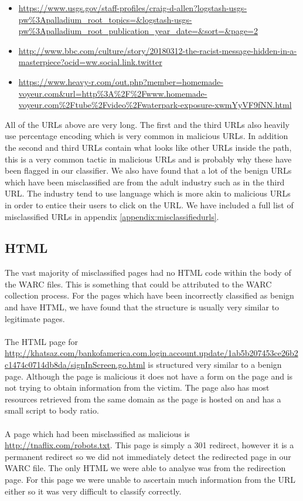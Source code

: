 \documentclass[12pt,twoside]{report}
\begin{document}
\begin{itemize}
    \item \url{https://www.usgs.gov/staff-profiles/craig-d-allen?logstash-usgs-pw\%3Apalladium_root_topics=&logstash-usgs-pw\%3Apalladium_root_publication_year_date=&sort=&page=2}
    \item \url{http://www.bbc.com/culture/story/20180312-the-racist-message-hidden-in-a-masterpiece?ocid=ww.social.link.twitter}
    \item \url{https://www.heavy-r.com/out.php?member=homemade-voyeur.com&url=http\%3A\%2F\%2Fwww.homemade-voyeur.com\%2Ftube\%2Fvideo\%2Fwaterpark-exposure-xwmYyVF9fNN.html}
\end{itemize}
All of the URLs above are very long. The first and the third URLs also heavily use percentage encoding which is very common in malicious URLs. In addition the second and third URLs contain what looks like other URLs inside the path, this is a very common tactic in malicious URLs and is probably why these have been flagged in our classifier. We also have found that a lot of the benign URLs which have been misclassified are from the adult industry such as in the third URL. The industry tend to use language which is more akin to malicious URLs in order to entice their users to click on the URL. We have included a full list of misclassified URLs in appendix \ref{appendix:misclassifiedurls}.
\subsection{HTML}
The vast majority of misclassified pages had no HTML code within the body of the WARC files. This is something that could be attributed to the WARC collection process. For the pages which have been incorrectly classified as benign and have HTML, we have found that the structure is usually very similar to legitimate pages.
\\\\
The HTML page for \url{http://khatsaz.com/bankofamerica.com.login.account.update/1ab5b207453ce26b2c1474c0714db8da/signInScreen.go.html} is structured very similar to a benign page. Although the page is malicious it does not have a form on the page and is not trying to obtain information from the victim. The page also has most resources retrieved from the same domain as the page is hosted on and has a small script to body ratio.
\\\\
A page which had been misclassified as malicious is \url{http://tnaflix.com/robots.txt}. This page is simply a 301 redirect, however it is a permanent redirect so we did not immediately detect the redirected page in our WARC file. The only HTML we were able to analyse was from the redirection page. For this page we were unable to ascertain much information from the URL either so it was very difficult to classify correctly.
\end{document}
